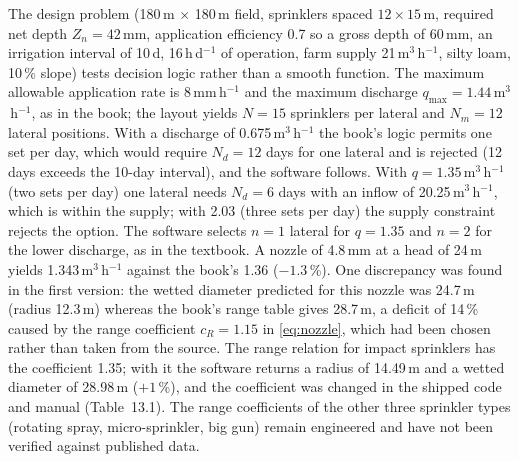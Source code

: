 \documentclass[preprint,12pt]{elsarticle}
\begin{document}
The design problem (180\,m $\times$ 180\,m field, sprinklers spaced $12\times15$\,m, required net depth $Z_n=42$\,mm, application efficiency 0.7 so a gross depth of 60\,mm, an irrigation interval of 10\,d, 16\,h\,d$^{-1}$ of operation, farm supply 21\,m$^3$\,h$^{-1}$, silty loam, 10\,\% slope) tests decision logic rather than a smooth function. The maximum allowable application rate is 8\,mm\,h$^{-1}$ and the maximum discharge $q_{\max}=1.44$\,m$^3$\,h$^{-1}$, as in the book; the layout yields $N=15$ sprinklers per lateral and $N_m=12$ lateral positions. With a discharge of 0.675\,m$^3$\,h$^{-1}$ the book's logic permits one set per day, which would require $N_d=12$ days for one lateral and is rejected (12 days exceeds the 10-day interval), and the software follows. With $q=1.35$\,m$^3$\,h$^{-1}$ (two sets per day) one lateral needs $N_d=6$ days with an inflow of 20.25\,m$^3$\,h$^{-1}$, which is within the supply; with 2.03 (three sets per day) the supply constraint rejects the option. The software selects $n=1$ lateral for $q=1.35$ and $n=2$ for the lower discharge, as in the textbook. A nozzle of 4.8\,mm at a head of 24\,m yields 1.343\,m$^3$\,h$^{-1}$ against the book's 1.36 ($-1.3$\,\%). One discrepancy was found in the first version: the wetted diameter predicted for this nozzle was 24.7\,m (radius 12.3\,m) whereas the book's range table gives 28.7\,m, a deficit of 14\,\% caused by the range coefficient $c_R=1.15$ in \cref{eq:nozzle}, which had been chosen rather than taken from the source. The \cite{Keller1990} range relation for impact sprinklers has the coefficient 1.35; with it the software returns a radius of 14.49\,m and a wetted diameter of 28.98\,m ($+1$\,\%), and the coefficient was changed in the shipped code and manual (Table~13.1). The range coefficients of the other three sprinkler types (rotating spray, micro-sprinkler, big gun) remain engineered and have not been verified against published data.
\end{document}
